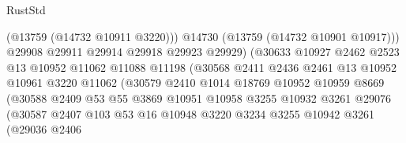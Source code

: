\begin{lexlean}{RustStd}
\begin{coremodule}
                                      (@13759 (@14732 @10911 @3220)))
                                    @14730
                                    (@13759 (@14732 @10901 @10917)))
                                  @29908
                                  @29911
                                  @29914
                                  @29918
                                  @29923
                                  @29929)
                                (@30633
                                  @10927
                                  @2462
                                  @2523
                                  @13
                                  @10952
                                  @11062
                                  @11088
                                  @11198
                                  (@30568
                                    @2411
                                    @2436
                                    @2461
                                    @13
                                    @10952
                                    @10961
                                    @3220
                                    @11062
                                    (@30579
                                      @2410
                                      @1014
                                      @18769
                                      @10952
                                      @10959
                                      @8669
                                      (@30588
                                        @2409
                                        @53
                                        @55
                                        @3869
                                        @10951
                                        @10958
                                        @3255
                                        @10932
                                        @3261
                                        @29076
                                        (@30587
                                          @2407
                                          @103
                                          @53
                                          @16
                                          @10948
                                          @3220
                                          @3234
                                          @3255
                                          @10942
                                          @3261
                                          (@29036
                                            @2406

\end{coremodule}
\end{lexlean}
